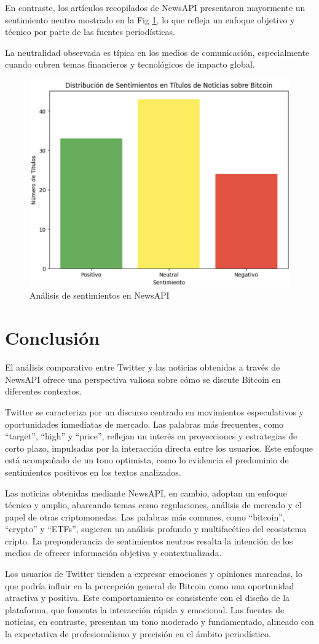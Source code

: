 \documentclass[journal]{IEEEtran}
\begin{document}
En contraste, los artículos recopilados de NewsAPI presentaron mayormente un sentimiento neutro mostrado en la Fig \ref{newsapi}, lo que refleja un enfoque objetivo y técnico por parte de las fuentes periodísticas. 

La neutralidad observada es típica en los medios de comunicación, especialmente cuando cubren temas financieros y tecnológicos de impacto global.
\begin{figure}
    \centering
    \includegraphics[width=0.5\linewidth]{Figs/NewsAPI.png}
    \caption{Análisis de sentimientos en NewsAPI}
    \label{newsapi}
\end{figure}

\section{Conclusión}
El análisis comparativo entre Twitter y las noticias obtenidas a través de NewsAPI ofrece una perspectiva valiosa sobre cómo se discute Bitcoin en diferentes contextos.

Twitter se caracteriza por un discurso centrado en movimientos especulativos y oportunidades inmediatas de mercado. Las palabras más frecuentes, como “target”, “high” y “price”, reflejan un interés en proyecciones y estrategias de corto plazo, impulsadas por la interacción directa entre los usuarios. Este enfoque está acompañado de un tono optimista, como lo evidencia el predominio de sentimientos positivos en los textos analizados.

Las noticias obtenidas mediante NewsAPI, en cambio, adoptan un enfoque técnico y amplio, abarcando temas como regulaciones, análisis de mercado y el papel de otras criptomonedas. Las palabras más comunes, como “bitcoin”, “crypto” y “ETFs”, sugieren un análisis profundo y multifacético del ecosistema cripto. La preponderancia de sentimientos neutros resalta la intención de los medios de ofrecer información objetiva y contextualizada.

Los usuarios de Twitter tienden a expresar emociones y opiniones marcadas, lo que podría influir en la percepción general de Bitcoin como una oportunidad atractiva y positiva. Este comportamiento es consistente con el diseño de la plataforma, que fomenta la interacción rápida y emocional.
Las fuentes de noticias, en contraste, presentan un tono moderado y fundamentado, alineado con la expectativa de profesionalismo y precisión en el ámbito periodístico.
\end{document}
